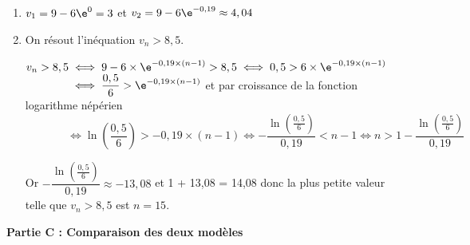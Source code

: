 \medskip

\begin{enumerate}
\item %
$v_1=9-6\e^{0}=3$ et $v_2=9-6\e^{-0,19}\approx 4,04$

\item On résout l'inéquation $v_n > 8,5$.

$v_n > 8,5
\iff
9 - 6 \times \e^{-0,19\times(n - 1)} > 8,5
\iff 
0,5 > 6 \times \e^{-0,19\times(n - 1)}
$\\

$\phantom{v_n > 8,5}\iff\dfrac{0,5}{6} > \e^{-0,19\times(n - 1)}$ et par croissance de la fonction logarithme népérien\\
$\phantom{v_n > 8,5}
\iff
\ln \left (\dfrac{0,5}{6}\right ) > -0,19\times (n-1)
\iff
-\dfrac{\ln \left (\frac{0,5}{6}\right )}{0,19} < n - 1 \iff n > 1 -\dfrac{\ln \left (\frac{0,5}{6}\right )}{0,19}$

Or $-\dfrac{\ln \left (\frac{0,5}{6}\right )}{0,19}\approx -13,08$ et 1 + 13,08 = 14,08 donc la plus petite valeur telle que $v_n > 8,5$ est $n = 15$.

\end{enumerate}

\bigskip

\textbf{Partie C : Comparaison des deux modèles}

\medskip

